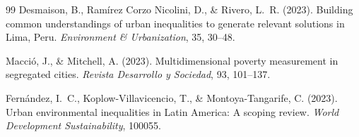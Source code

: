 \documentclass[12pt,a4paper,twoside]{article}
\begin{document}
\begin{thebibliography}{99}
Desmaison, B., Ram\'irez Corzo Nicolini, D., \& Rivero, L.~R. (2023).
Building common understandings of urban inequalities to generate relevant
solutions in {Lima, Peru}.
\textit{Environment \& Urbanization}, 35, 30--48.

Macci\'o, J., \& Mitchell, A. (2023).
Multidimensional poverty measurement in segregated cities.
\textit{Revista Desarrollo y Sociedad}, 93, 101--137.

Fern\'andez, I.~C., Koplow-Villavicencio, T., \& Montoya-Tangarife, C. (2023).
Urban environmental inequalities in {Latin America}: A scoping review.
\textit{World Development Sustainability}, 100055.

\end{thebibliography}
\end{document}
